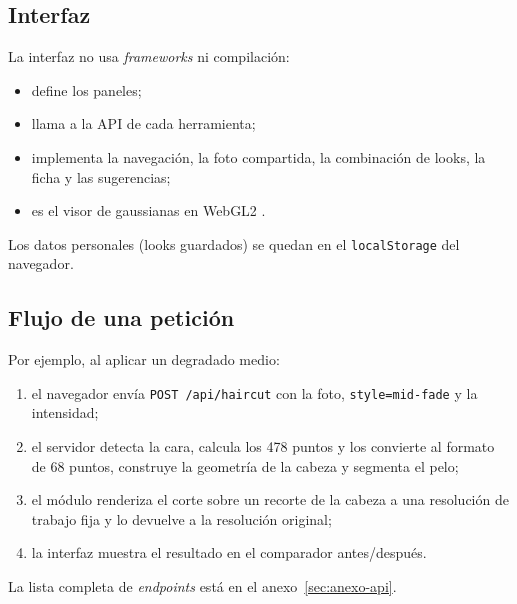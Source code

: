 \subsection{Interfaz}

La interfaz no usa \emph{frameworks} ni compilación:
\begin{itemize}
  \item {} define los paneles;
  \item {} llama a la API de cada herramienta;
  \item {} implementa la navegación, la foto compartida, la combinación de looks, la ficha y las sugerencias;
  \item {} es el visor de gaussianas en WebGL2 \cite{khronos2017}.
\end{itemize}
Los datos personales (looks guardados) se quedan en el \texttt{localStorage} del navegador.

\subsection{Flujo de una petición}

Por ejemplo, al aplicar un degradado medio:
\begin{enumerate}
  \item el navegador envía \texttt{POST /api/haircut} con la foto, \texttt{style=mid-fade} y la intensidad;
  \item el servidor detecta la cara, calcula los 478 puntos y los convierte al formato de 68 puntos, construye la geometría de la cabeza y segmenta el pelo;
  \item el módulo  renderiza el corte sobre un recorte de la cabeza a una resolución de trabajo fija y lo devuelve a la resolución original;
  \item la interfaz muestra el resultado en el comparador antes/después.
\end{enumerate}
La lista completa de \emph{endpoints} está en el anexo~\ref{sec:anexo-api}.
